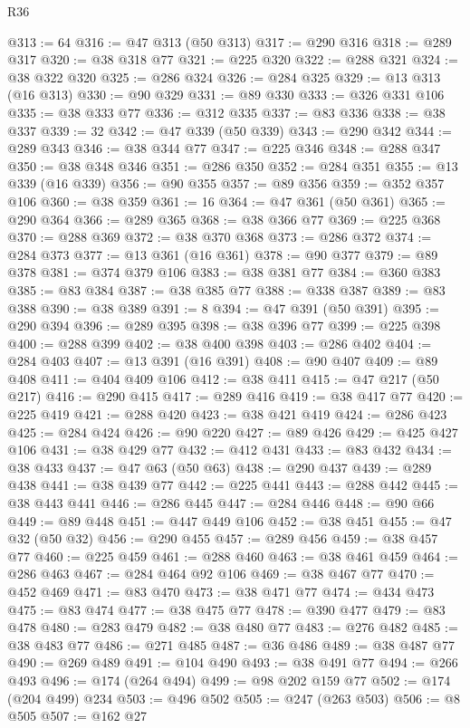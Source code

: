 \begin{lexlean}{R36}
\begin{coremodule}
@313 := 64
@316 := @47 @313 (@50 @313)
@317 := @290 @316
@318 := @289 @317
@320 := @38 @318 @77
@321 := @225 @320
@322 := @288 @321
@324 := @38 @322 @320
@325 := @286 @324
@326 := @284 @325
@329 := @13 @313 (@16 @313)
@330 := @90 @329
@331 := @89 @330
@333 := @326 @331 @106
@335 := @38 @333 @77
@336 := @312 @335
@337 := @83 @336
@338 := @38 @337
@339 := 32
@342 := @47 @339 (@50 @339)
@343 := @290 @342
@344 := @289 @343
@346 := @38 @344 @77
@347 := @225 @346
@348 := @288 @347
@350 := @38 @348 @346
@351 := @286 @350
@352 := @284 @351
@355 := @13 @339 (@16 @339)
@356 := @90 @355
@357 := @89 @356
@359 := @352 @357 @106
@360 := @38 @359
@361 := 16
@364 := @47 @361 (@50 @361)
@365 := @290 @364
@366 := @289 @365
@368 := @38 @366 @77
@369 := @225 @368
@370 := @288 @369
@372 := @38 @370 @368
@373 := @286 @372
@374 := @284 @373
@377 := @13 @361 (@16 @361)
@378 := @90 @377
@379 := @89 @378
@381 := @374 @379 @106
@383 := @38 @381 @77
@384 := @360 @383
@385 := @83 @384
@387 := @38 @385 @77
@388 := @338 @387
@389 := @83 @388
@390 := @38 @389
@391 := 8
@394 := @47 @391 (@50 @391)
@395 := @290 @394
@396 := @289 @395
@398 := @38 @396 @77
@399 := @225 @398
@400 := @288 @399
@402 := @38 @400 @398
@403 := @286 @402
@404 := @284 @403
@407 := @13 @391 (@16 @391)
@408 := @90 @407
@409 := @89 @408
@411 := @404 @409 @106
@412 := @38 @411
@415 := @47 @217 (@50 @217)
@416 := @290 @415
@417 := @289 @416
@419 := @38 @417 @77
@420 := @225 @419
@421 := @288 @420
@423 := @38 @421 @419
@424 := @286 @423
@425 := @284 @424
@426 := @90 @220
@427 := @89 @426
@429 := @425 @427 @106
@431 := @38 @429 @77
@432 := @412 @431
@433 := @83 @432
@434 := @38 @433
@437 := @47 @63 (@50 @63)
@438 := @290 @437
@439 := @289 @438
@441 := @38 @439 @77
@442 := @225 @441
@443 := @288 @442
@445 := @38 @443 @441
@446 := @286 @445
@447 := @284 @446
@448 := @90 @66
@449 := @89 @448
@451 := @447 @449 @106
@452 := @38 @451
@455 := @47 @32 (@50 @32)
@456 := @290 @455
@457 := @289 @456
@459 := @38 @457 @77
@460 := @225 @459
@461 := @288 @460
@463 := @38 @461 @459
@464 := @286 @463
@467 := @284 @464 @92 @106
@469 := @38 @467 @77
@470 := @452 @469
@471 := @83 @470
@473 := @38 @471 @77
@474 := @434 @473
@475 := @83 @474
@477 := @38 @475 @77
@478 := @390 @477
@479 := @83 @478
@480 := @283 @479
@482 := @38 @480 @77
@483 := @276 @482
@485 := @38 @483 @77
@486 := @271 @485
@487 := @36 @486
@489 := @38 @487 @77
@490 := @269 @489
@491 := @104 @490
@493 := @38 @491 @77
@494 := @266 @493
@496 := @174 (@264 @494)
@499 := @98 @202 @159 @77
@502 := @174 (@204 @499) @234
@503 := @496 @502
@505 := @247 (@263 @503)
@506 := @8 @505
@507 := @162 @27

\end{coremodule}
\end{lexlean}
